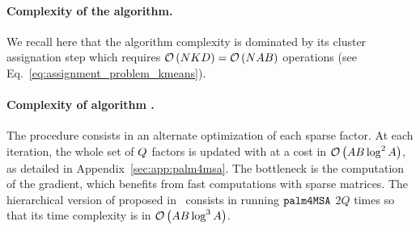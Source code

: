
\paragraph{Complexity of the \kmeans algorithm.}
We recall here that the \kmeans algorithm complexity is dominated by its cluster assignation step which requires $\mathcal{O}\left (NKD\right )=\mathcal{O}\left (N A B\right )$ operations (see Eq.~\eqref{eq:assignment_problem_kmeans}).

\paragraph{Complexity of algorithm \palm.} The procedure consists in an alternate optimization of each sparse factor. 
At each iteration, the whole set of $Q$ factors is updated with at a cost in $\mathcal{O}\left (AB\log^2 A\right )$, as detailed in Appendix~\ref{sec:app:palm4msa}. 
The bottleneck is the computation of the gradient, which benefits from fast computations with sparse matrices.
The hierarchical version of \palm proposed in~\cite{LeMagoarou2016Flexible} consists in running $\texttt{palm4MSA}$ $2Q$ times so that its time complexity is in $\mathcal{O}\left (AB\log^3 A\right )$.

